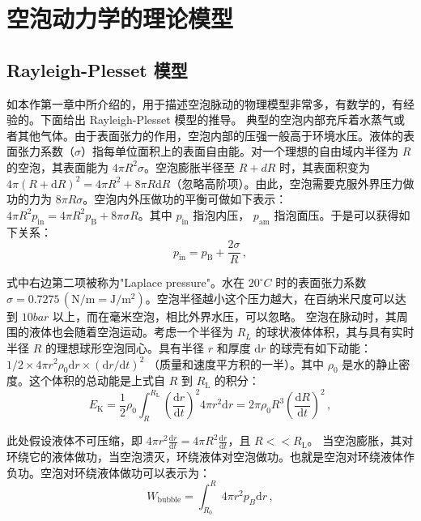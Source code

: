 %
\section{空泡动力学的理论模型}


\subsection{Rayleigh-Plesset
模型}

如本作第一章中所介绍的，用于描述空泡脉动的物理模型非常多，有数学的，有经验的。下面给出
Rayleigh-Plesset 模型的推导。
典型的空泡内部充斥着水蒸气或者其他气体。由于表面张力的作用，空泡内部的压强一般高于环境水压。液体的表面张力系数（$\sigma$）指每单位面积上的表面自由能。对一个理想的自由域内半径为
$R$ 的空泡，其表面能为 $4\pi R^2 \sigma$。空泡膨胀半径至 $R+d R$
时，其表面积变为
$4\pi (R+\mathrm{d}R)^2=4\pi R^2+8\pi R\mathrm{d}R$（忽略高阶项）。由此，空泡需要克服外界压力做功的力为
$8\pi R\sigma$。空泡内外压做功的平衡可做如下表示：$4 \pi R ^ { 2 } p _ \mathrm{ i n } = 4 \pi R ^ { 2 } p _ \mathrm{ B } + 8 \pi \sigma R$。其中
$p_\mathrm{in}$ 指泡内压， $p_\mathrm{am }$
指泡面压。于是可以获得如下关系：
\begin{equation}
    p_{\mathrm {in }}=p_{\mathrm {B}}+\frac{2 \sigma}{R} \,,
    \label{2.4}
\end{equation}

 式中右边第二项被称为"Laplace pressure"。水在 $20^\circ C$
时的表面张力系数
$\sigma=0.7275\,(\mathrm{N/m=J/m^2})$。空泡半径越小这个压力越大，在百纳米尺度可以达到
$10bar$ 以上，而在毫米空泡，相比外界水压，可以忽略。
空泡在脉动时，其周围的液体也会随着空泡运动。考虑一个半径为 $R_L$
的球状液体体积，其与具有实时半径 $R$ 的理想球形空泡同心。具有半径 $r$
和厚度 $\mathrm d r$ 的球壳有如下动能：
$1 / 2 \times 4 \pi r ^ { 2 } \rho_ { 0 } \mathrm d r \times ( \mathrm d r / \mathrm d t ) ^ { 2 }$
（质量和速度平方积的一半）。其中 $\rho_0$
是水的静止密度。这个体积的总动能是上式自 $R$ 到 $R_\mathrm L$
的积分： 
\begin{equation}
    E_\mathrm{K} =\frac{ 1 }{ 2 } \rho_{ 0 } \int_{ R } ^ {R_\mathrm{L}} (\frac{\mathrm d r } { \mathrm d t })^ 2 4\pi r^2 \mathrm d r = 2 \pi\rho_0 R^3 ( \frac{ \mathrm d R }{ \mathrm d t } )^2   \,,
    \label{2.5}
\end{equation}
 
 此处假设液体不可压缩，即
$4 \pi r ^ { 2 } \frac {\mathrm d r } {\mathrm d t } = 4 \pi R ^ { 2 } \frac { \mathrm d r } { \mathrm d t }$，且
$R<<R_\mathrm{L}$。
当空泡膨胀，其对环绕它的液体做功，当空泡溃灭，环绕液体对空泡做功。也就是空泡对环绕液体作负功。空泡对环绕液体做功可以表示为：
\begin{equation}
W _ \mathrm{ b u b b l e } = \int _ {R_\mathrm{0} } ^ { R } 4 \pi r ^ { 2 } p _ { B } \mathrm d r\,, 
\label{2.6}
\end{equation}

